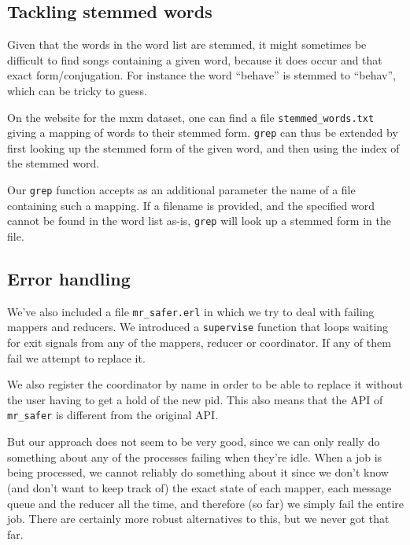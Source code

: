 \documentclass[a4paper]{article}
\begin{document}
\subsection*{Tackling stemmed words}
Given that the words in the word list are stemmed, it might sometimes be difficult to find songs containing a given word, because it does occur and that exact form/conjugation. For instance the word ``behave'' is stemmed to ``behav'', which can be tricky to guess.

On the website for the mxm dataset, one can find a file \texttt{stemmed\_words.txt} giving a mapping of words to their stemmed form. \texttt{grep} can thus be extended by first looking up the stemmed form of the given word, and then using the index of the stemmed word. 

Our \texttt{grep} function accepts as an additional parameter the name of a file containing such a mapping. If a filename is provided, and the specified word cannot be found in the word list as-is, \texttt{grep} will look up a stemmed form in the file.

\subsection*{Error handling}
We've also included a file \texttt{mr\_safer.erl} in which we try to deal with failing mappers and reducers. We introduced a \texttt{supervise} function that loops waiting for exit signals from any of the mappers, reducer or coordinator. If any of them fail we attempt to replace it.

We also register the coordinator by name in order to be able to replace it without the user having to get a hold of the new pid. This also means that the API of \texttt{mr\_safer} is different from the original API.

But our approach does not seem to be very good, since we can only really do something about any of the processes failing when they're idle. When a job is being processed, we cannot reliably do something about it since we don't know (and don't want to keep track of) the exact state of each mapper, each message queue and the reducer all the time, and therefore (so far) we simply fail the entire job. There are certainly more robust alternatives to this, but we never got that far.
\end{document}
